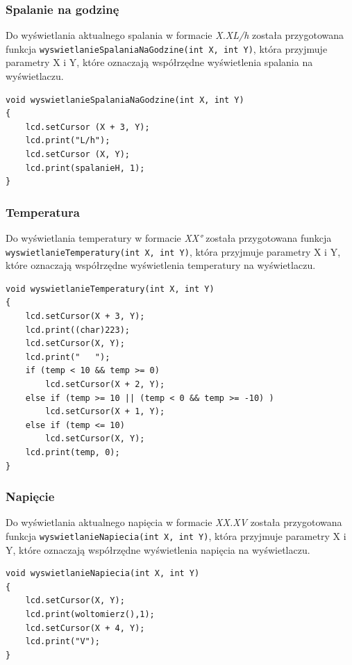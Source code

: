 \subsubsection{Spalanie na godzinę}
Do wyświetlania aktualnego spalania w formacie \textit{X.XL/h} została przygotowana funkcja \texttt{wyswietlanieSpalaniaNaGodzine(int X, int Y)}, która przyjmuje parametry X i Y, które oznaczają współrzędne wyświetlenia spalania na wyświetlaczu.
\begin{lstlisting}[label=list:show_fuel_cons_hour,caption=Wyświetlanie spalania na godzinę,
basicstyle=\footnotesize\ttfamily]
void wyswietlanieSpalaniaNaGodzine(int X, int Y)
{
    lcd.setCursor (X + 3, Y);
	lcd.print("L/h");
	lcd.setCursor (X, Y);
	lcd.print(spalanieH, 1);
}
\end{lstlisting}

\subsubsection{Temperatura}
Do wyświetlania temperatury w formacie \textit{XX°} została przygotowana funkcja \texttt{wyswietlanieTemperatury(int X, int Y)}, która przyjmuje parametry X i Y, które oznaczają współrzędne wyświetlenia temperatury na wyświetlaczu.
\begin{lstlisting}[label=list:show_tempr,caption=Wyświetlanie temperatury,
basicstyle=\footnotesize\ttfamily]
void wyswietlanieTemperatury(int X, int Y)
{
    lcd.setCursor(X + 3, Y);
    lcd.print((char)223);
    lcd.setCursor(X, Y);
    lcd.print("   ");
    if (temp < 10 && temp >= 0)
    	lcd.setCursor(X + 2, Y);
    else if (temp >= 10 || (temp < 0 && temp >= -10) )
    	lcd.setCursor(X + 1, Y);
    else if (temp <= 10)
    	lcd.setCursor(X, Y);
    lcd.print(temp, 0);
}
\end{lstlisting}

\subsubsection{Napięcie}
Do wyświetlania aktualnego napięcia w formacie \textit{XX.XV} została przygotowana funkcja \texttt{wyswietlanieNapiecia(int X, int Y)}, która przyjmuje parametry X i Y, które oznaczają współrzędne wyświetlenia napięcia na wyświetlaczu.
\begin{lstlisting}[label=list:show_voltage,caption=Wyświetlanie napięcia,
basicstyle=\footnotesize\ttfamily]
void wyswietlanieNapiecia(int X, int Y)
{
    lcd.setCursor(X, Y);
    lcd.print(woltomierz(),1);
    lcd.setCursor(X + 4, Y);
    lcd.print("V");
}
\end{lstlisting}

